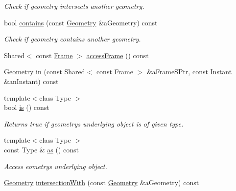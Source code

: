 \begin{DoxyCompactItemize}
\begin{DoxyCompactList}\small\item\em Check if geometry intersects another geometry. \end{DoxyCompactList}\item 
bool \hyperlink{classlibrary_1_1physics_1_1env_1_1object_1_1_geometry_a9122be6cc4de97bb7aec4ad66bee823d}{contains} (const \hyperlink{classlibrary_1_1physics_1_1env_1_1object_1_1_geometry}{Geometry} \&a\+Geometry) const
\begin{DoxyCompactList}\small\item\em Check if geometry contains another geometry. \end{DoxyCompactList}\item 
Shared$<$ const \hyperlink{classlibrary_1_1physics_1_1coord_1_1_frame}{Frame} $>$ \hyperlink{classlibrary_1_1physics_1_1env_1_1object_1_1_geometry_a1a0569b5cdfba033d355057e215e22b8}{access\+Frame} () const
\item 
\hyperlink{classlibrary_1_1physics_1_1env_1_1object_1_1_geometry}{Geometry} \hyperlink{classlibrary_1_1physics_1_1env_1_1object_1_1_geometry_a3538be01a00bf3aae3c1fbc0e7f4fb6b}{in} (const Shared$<$ const \hyperlink{classlibrary_1_1physics_1_1coord_1_1_frame}{Frame} $>$ \&a\+Frame\+S\+Ptr, const \hyperlink{classlibrary_1_1physics_1_1time_1_1_instant}{Instant} \&an\+Instant) const
\item 
{\footnotesize template$<$class Type $>$ }\\bool \hyperlink{classlibrary_1_1physics_1_1env_1_1object_1_1_geometry_adbc414eca7c97459b78564253c118132}{is} () const
\begin{DoxyCompactList}\small\item\em Returns true if geometry\textquotesingle{}s underlying object is of given type. \end{DoxyCompactList}\item 
{\footnotesize template$<$class Type $>$ }\\const Type \& \hyperlink{classlibrary_1_1physics_1_1env_1_1object_1_1_geometry_a4bded0d750a47eaf975cf2f70dafe6e9}{as} () const
\begin{DoxyCompactList}\small\item\em Access eometry\textquotesingle{}s underlying object. \end{DoxyCompactList}\item 
\hyperlink{classlibrary_1_1physics_1_1env_1_1object_1_1_geometry}{Geometry} \hyperlink{classlibrary_1_1physics_1_1env_1_1object_1_1_geometry_a2fccc85beb614199e87a44546c397f7c}{intersection\+With} (const \hyperlink{classlibrary_1_1physics_1_1env_1_1object_1_1_geometry}{Geometry} \&a\+Geometry) const
\end{DoxyCompactItemize}
